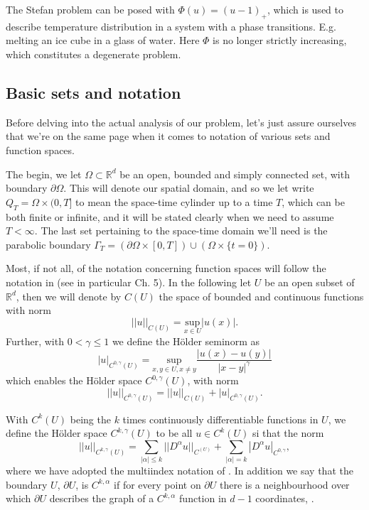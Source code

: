 \documentclass[11pt, a4paper]{article}
\begin{document}
\begin{example}
The Stefan problem can be posed with $\Phi(u) = (u-1)_+$, which is used to describe temperature distribution in a system with a phase transitions. E.g. melting an ice cube in a glass of water. Here $\Phi$ is no longer strictly increasing, which constitutes a degenerate problem.
\end{example}

\subsection{Basic sets and notation}
Before delving into the actual analysis of our problem, let's just assure ourselves that we're on the same page when it comes to notation of various sets and function spaces.

The begin, we let $\Omega \subset \mathbb{R}^d$ be an open, bounded and simply connected set, with boundary $\partial \Omega$. This will denote our spatial domain, and so we let write $Q_T = \Omega \times (0,T]$ to mean the space-time cylinder up to a time $T$, which can be both finite or infinite, and it will be stated clearly when we need to assume $T < \infty$.  The last set pertaining to the space-time domain we'll need is the parabolic boundary $\Gamma_T = (\partial \Omega \times [0,T]) \cup (\Omega\times \{t=0\})$.


Most, if not all, of the notation concerning function spaces will follow the notation in \citep{evans} (see in particular Ch. 5). In the following let $U$ be an open subset of $\mathbb{R}^d$, then we will denote by $C(U)$ the space of bounded and continuous functions with norm
\begin{equation*}
||u||_{C(U)} = \underset{x \in U}{\mathrm{sup}}|u(x)|.
\end{equation*}
Further, with $0< \gamma \leq 1$ we define the Hölder seminorm as
\begin{equation*}
|u|_{C^{0,\gamma}(U)} = \underset{x,y \in U, x\neq y}{\mathrm{sup}}\frac{|u(x)-u(y)|}{|x-y|^\gamma}
\end{equation*}
which enables the Hölder space $C^{0,\gamma}(U)$, with norm
\begin{equation*}
||u||_{C^{0,\gamma}(U)} = ||u||_{C(U)} + |u|_{C^{0,\gamma}(U)}.
\end{equation*}

With $C^k(U)$ being the $k$ times continuously differentiable functions in $U$, we define the Hölder space $C^{k,\gamma}(U)$ to be all $u \in C^{k}(U)$ si that the norm
\begin{equation*}
||u||_{C^{k,\gamma}(U)} = \sum_{|\alpha| \leq k} ||D^\alpha u||_{C^(U)} + \sum_{|\alpha| = k} |D^\alpha u |_{C^{0,\gamma}},
\end{equation*}
where we have adopted the multiindex notation of \citep{evans}. In addition we say that the boundary $U$, $\partial U$, is $C^{k, \alpha}$ if for every point on $\partial U$ there is a neighbourhood over which $\partial U$ describes the graph of a $C^{k,\alpha}$ function in $d-1$ coordinates, \citep{gilbarg2001elliptic}.
\end{document}
